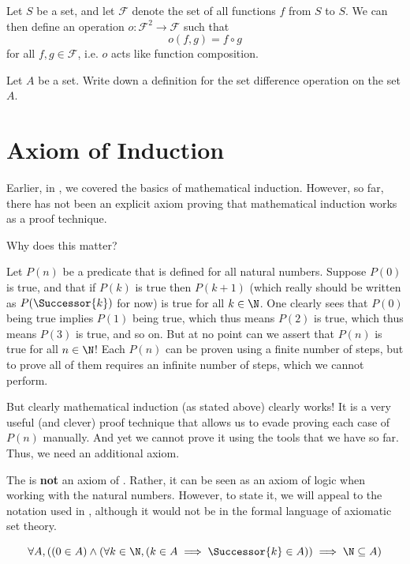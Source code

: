\begin{example}
    Let $S$ be a set, and let $\mathcal{F}$ denote the set of all functions $f$ from $S$ to $S$. We can then define an operation $o: \mathcal{F}^2 \to \mathcal{F}$ such that
    \[
        o(f, g) = f \circ g
    \]
    for all $f, g \in \mathcal{F}$, i.e. $o$ acts like function composition.
\end{example}

\begin{exercise}
    Let $A$ be a set. Write down a definition for the set difference operation on the set $A$.
\end{exercise}

\section{Axiom of Induction}
Earlier, in , we covered the basics of mathematical induction. However, so far, there has not been an explicit axiom proving that mathematical induction works as a proof technique.

Why does this matter?

Let $P(n)$ be a predicate that is defined for all natural numbers. Suppose $P(0)$ is true, and that if $P(k)$ is true then $P(k+1)$ (which really should be written as $P(\Successor{k})$ for now) is true for all $k \in \N$. One clearly sees that $P(0)$ being true implies $P(1)$ being true, which thus means $P(2)$ is true, which thus means $P(3)$ is true, and so on. But at no point can we assert that $P(n)$ is true for all $n \in \N$! Each $P(n)$ can be proven using a finite number of steps, but to prove all of them requires an infinite number of steps, which we cannot perform.

But clearly mathematical induction (as stated above) clearly works! It is a very useful (and clever) proof technique that allows us to evade proving each case of $P(n)$ manually. And yet we cannot prove it using the tools that we have so far. Thus, we need an additional axiom.

The  is \textbf{not} an axiom of \ZFC. Rather, it can be seen as an axiom of logic when working with the natural numbers. However, to state it, we will appeal to the notation used in \ZFC, although it would not be in the formal language of axiomatic set theory.

\begin{axiom}[Induction]\label{axiom:induction}
    \vspace{-10px}
    \[
        \forall A, \left((0 \in A) \land (\forall k \in \N, (k \in A \implies \Successor{k} \in A)) \implies \N \subseteq A\right)
    \]
\end{axiom}

